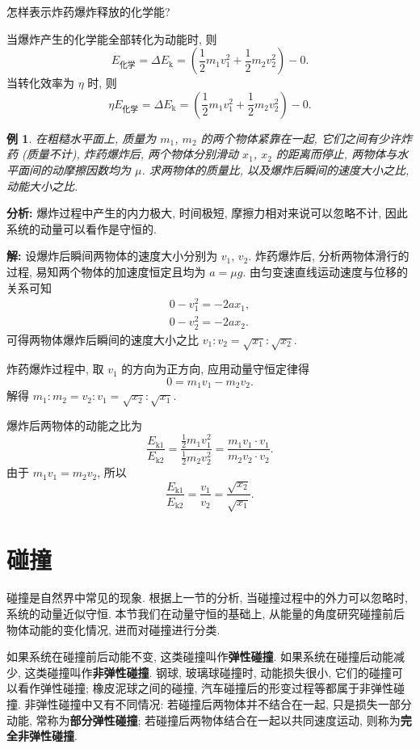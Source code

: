 \documentclass[UTF8,openany,fontset=fandol]{ctexbook}
\theoremstyle{chinesetextbook}
\newtheorem{example}{例}[chapter]
\newenvironment{solution}{\par\indent\textbf{解:} \ignorespaces}{\par}
\begin{document}
{\kaishu 怎样表示炸药爆炸释放的化学能?}

当爆炸产生的化学能全部转化为动能时, 则
\[
E_\text{化学}=\Delta E_\mathrm{k}=\left(\frac12m_1v_1^2+\frac12m_2v_2^2\right)-0.
\]
当转化效率为 $\eta$ 时, 则
\[
\eta E_\text{化学}=\Delta E_\mathrm{k}=\left(\frac12m_1v_1^2+\frac12m_2v_2^2\right)-0.
\]
\begin{example}
在粗糙水平面上, 质量为 $m_1$, $m_2$ 的两个物体紧靠在一起, 它们之间有少许炸药 (质量不计), 炸药爆炸后, 两个物体分别滑动 $x_1$, $x_2$ 的距离而停止, 两物体与水平面间的动摩擦因数均为 $\mu$. 求两物体的质量比, 以及爆炸后瞬间的速度大小之比, 动能大小之比.
\end{example}
\par\indent\textbf{分析:} 爆炸过程中产生的内力极大, 时间极短, 摩擦力相对来说可以忽略不计, 因此系统的动量可以看作是守恒的.

\begin{solution}
设爆炸后瞬间两物体的速度大小分别为 $v_1$, $v_2$. 炸药爆炸后, 分析两物体滑行的过程, 易知两个物体的加速度恒定且均为 $a=\mu g$. 由匀变速直线运动速度与位移的关系可知
\[
\begin{gathered}
0-v_1^2=-2ax_1,\\
0-v_2^2=-2ax_2.
\end{gathered}
\]
可得两物体爆炸后瞬间的速度大小之比 $v_1: v_2=\sqrt{x_1}:\sqrt{x_2}$.

炸药爆炸过程中, 取 $v_1$ 的方向为正方向, 应用动量守恒定律得
\[
0=m_1v_1-m_2v_2.
\]
解得 $m_1: m_2=v_2: v_1=\sqrt{x_2}:\sqrt{x_1}$.

爆炸后两物体的动能之比为
\[
\frac{E_\mathrm{k1}}{E_\mathrm{k2}}=\frac{\frac12 m_1v_1^2}{\frac12m_2v_2^2}=\frac{m_1v_1\cdot v_1}{m_2v_2\cdot v_2}.
\]
由于 $m_1v_1=m_2v_2$, 所以
\[
\frac{E_\mathrm{k1}}{E_\mathrm{k2}}=\frac{v_1}{v_2}=\frac{\sqrt{x_2}}{\sqrt{x_1}}.
\]
\end{solution}
\section{碰撞}
碰撞是自然界中常见的现象. 根据上一节的分析, 当碰撞过程中的外力可以忽略时, 系统的动量近似守恒. 本节我们在动量守恒的基础上, 从能量的角度研究碰撞前后物体动能的变化情况, 进而对碰撞进行分类.

如果系统在碰撞前后动能不变, 这类碰撞叫作\textbf{弹性碰撞}. 如果系统在碰撞后动能减少, 这类碰撞叫作\textbf{非弹性碰撞}. 钢球, 玻璃球碰撞时, 动能损失很小, 它们的碰撞可以看作弹性碰撞; 橡皮泥球之间的碰撞, 汽车碰撞后的形变过程等都属于非弹性碰撞. 非弹性碰撞中又有不同情况: 若碰撞后两物体并不结合在一起, 只是损失一部分动能, 常称为\textbf{部分弹性碰撞}; 若碰撞后两物体结合在一起以共同速度运动, 则称为\textbf{完全非弹性碰撞}.
\end{document}
